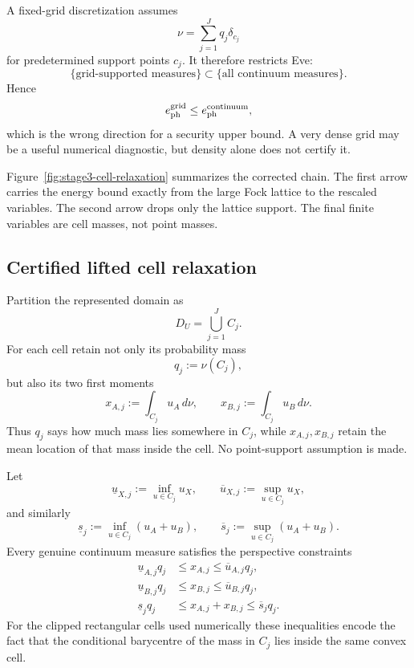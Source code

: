 \documentclass[11pt]{article}
\theoremstyle{remark}
\begin{document}
A fixed-grid discretization assumes
\[
    \nu
    =
    \sum_{j=1}^Jq_j\delta_{c_j}
\]
for predetermined support points \(c_j\).  It therefore restricts Eve:
\[
    \{\text{grid-supported measures}\}
    \subset
    \{\text{all continuum measures}\}.
\]
Hence
\begin{equation}
    e_{\rm ph}^{\rm grid}
    \le
    e_{\rm ph}^{\rm continuum},
    \label{eq:stage3-grid-inner}
\end{equation}
which is the wrong direction for a security upper bound.  A very dense grid
may be a useful numerical diagnostic, but density alone does not certify it.

Figure~\ref{fig:stage3-cell-relaxation} summarizes the corrected chain.  The
first arrow carries the energy bound exactly from the large Fock lattice to
the rescaled variables.  The second arrow drops only the lattice support.
The final finite variables are cell masses, not point masses.



\subsection{Certified lifted cell relaxation}

Partition the represented domain as
\[
    D_U=\bigcup_{j=1}^{J}C_j.
\]
For each cell retain not only its probability mass
\begin{equation}
    q_j:=\nu(C_j),
    \label{eq:stage3-cell-mass}
\end{equation}
but also its two first moments
\begin{equation}
    x_{A,j}
    :=
    \int_{C_j}u_A\,d\nu,
    \qquad
    x_{B,j}
    :=
    \int_{C_j}u_B\,d\nu.
    \label{eq:stage3-cell-first-moments}
\end{equation}
Thus \(q_j\) says how much mass lies somewhere in \(C_j\), while
\(x_{A,j},x_{B,j}\) retain the mean location of that mass inside the cell.
No point-support assumption is made.

Let
\[
    \underline u_{X,j}:=\inf_{u\in C_j}u_X,
    \qquad
    \overline u_{X,j}:=\sup_{u\in C_j}u_X,
\]
and similarly
\[
    \underline s_j:=\inf_{u\in C_j}(u_A+u_B),
    \qquad
    \overline s_j:=\sup_{u\in C_j}(u_A+u_B).
\]
Every genuine continuum measure satisfies the perspective constraints
\begin{align}
    \underline u_{A,j}q_j
    &\le x_{A,j}\le
    \overline u_{A,j}q_j,
    \\
    \underline u_{B,j}q_j
    &\le x_{B,j}\le
    \overline u_{B,j}q_j,
    \\
    \underline s_jq_j
    &\le x_{A,j}+x_{B,j}\le
    \overline s_jq_j.
    \label{eq:stage3-cell-perspective}
\end{align}
For the clipped rectangular cells used numerically these inequalities encode
the fact that the conditional barycentre of the mass in \(C_j\) lies inside
the same convex cell.
\end{document}
